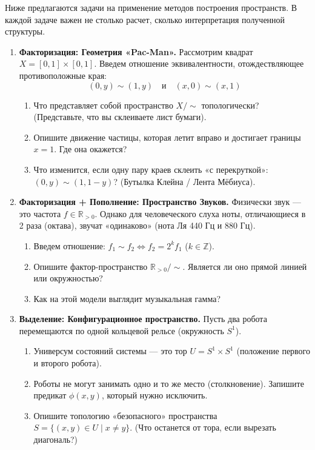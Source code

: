 \documentclass[11pt, a4paper]{extarticle}
\newcommand{\Z}{{\mathbb Z}}
\newcommand{\R}{{\mathbb R}}
\begin{document}
\begin{exercise}
    Ниже предлагаются задачи на применение методов построения пространств. В каждой задаче важен не столько расчет, сколько интерпретация полученной структуры.
    
    \begin{enumerate}
        \item \textbf{Факторизация: Геометрия «Pac-Man».}
        Рассмотрим квадрат $X = [0, 1] \times [0, 1]$. Введем отношение эквивалентности, отождествляющее противоположные края:
        $$(0, y) \sim (1, y) \quad \text{и} \quad (x, 0) \sim (x, 1)$$
        \begin{enumerate}
            \item Что представляет собой пространство $X/{\sim}$ топологически? (Представьте, что вы склеиваете лист бумаги).
            \item Опишите движение частицы, которая летит вправо и достигает границы $x=1$. Где она окажется?
            \item Что изменится, если одну пару краев склеить «с перекруткой»: $(0, y) \sim (1, 1-y)$? (Бутылка Клейна / Лента Мёбиуса).
        \end{enumerate}
    
        \item \textbf{Факторизация + Пополнение: Пространство Звуков.}
        Физически звук — это частота $f \in \R_{>0}$. Однако для человеческого слуха ноты, отличающиеся в 2 раза (октава), звучат «одинаково» (нота Ля 440 Гц и 880 Гц).
        \begin{enumerate}
            \item Введем отношение: $f_1 \sim f_2 \iff f_2 = 2^k f_1$ ($k \in \Z$).
            \item Опишите фактор-пространство $\R_{>0} / {\sim}$. Является ли оно прямой линией или окружностью?
            \item Как на этой модели выглядит музыкальная гамма?
        \end{enumerate}
    
        \item \textbf{Выделение: Конфигурационное пространство.}
        Пусть два робота перемещаются по одной кольцевой рельсе (окружность $S^1$).
        \begin{enumerate}
            \item Универсум состояний системы — это тор $U = S^1 \times S^1$ (положение первого и второго робота).
            \item Роботы не могут занимать одно и то же место (столкновение). Запишите предикат $\phi(x, y)$, который нужно исключить.
            \item Опишите топологию «безопасного» пространства $S = \{ (x,y) \in U \mid x \neq y \}$. (Что останется от тора, если вырезать диагональ?)
        \end{enumerate}
    

\end{enumerate}
\end{exercise}
\end{document}
